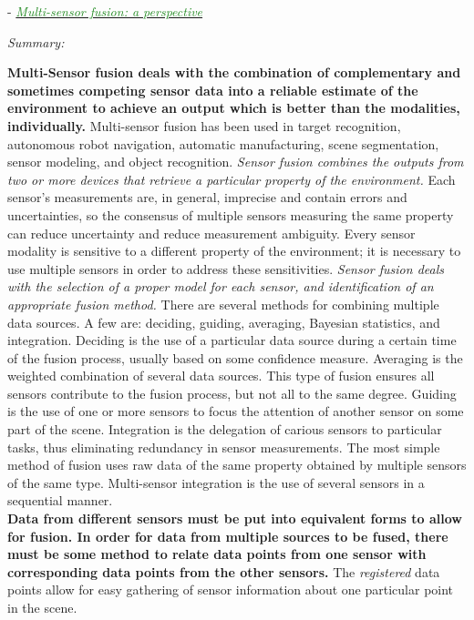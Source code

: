 \documentclass[]{article}
\newcommand{\paperentry}[4]{
            \hangindent=1cm
            \textcolor{red}{\cite{#1}} - \href{run:../References/#3}{\textcolor{ForestGreen}{\textit{#2}}}
            
            \noindent            
            \begin{minipage}[t]{0.1\linewidth}\hfill\end{minipage}
            \begin{minipage}[t]{0.8\linewidth}\textcolor{NavyBlue}{{\textit{Summary:}}}#4\end{minipage}
            \vspace{.25cm}
          }
\begin{document}
			
			\paperentry{hackett1990multisensorfusion}
			{Multi-sensor fusion: a perspective}
			{Fusion/Reviews/hackett1990multisensorfusion.pdf}
			{}\newline
			\textbf{Multi-Sensor fusion deals with the combination of complementary and sometimes competing sensor data into a reliable estimate of the environment to achieve an output which is better than the modalities, individually.}  Multi-sensor fusion has been used  in target recognition, autonomous robot navigation, automatic manufacturing, scene segmentation, sensor modeling, and object recognition.  \textit{Sensor fusion combines the outputs from two or more devices that retrieve a particular property of the environment.}  Each sensor's measurements are, in general, imprecise and contain errors and uncertainties, so the consensus of multiple sensors measuring the same property can reduce uncertainty and reduce measurement ambiguity. Every sensor modality is sensitive to a different property of the environment; it is necessary to use multiple sensors in order to address these sensitivities. \textit{Sensor fusion deals with the selection of a proper model  for each sensor, and identification of an appropriate fusion method.}  There are several methods for combining multiple data sources.  A few are: deciding, guiding, averaging, Bayesian statistics, and integration.  Deciding is the use of a particular data source during a certain time of the fusion process, usually based on some confidence measure.  Averaging is the weighted combination of several data sources. This type of fusion ensures all sensors contribute to the fusion process, but not all to the same degree.  Guiding is the use of one or more sensors to focus the attention of another sensor on some part of the scene.  Integration is the  delegation of carious sensors to particular tasks, thus eliminating redundancy in sensor measurements.  The most simple method of fusion uses raw data of the same property obtained by multiple sensors of the same type.  Multi-sensor integration is the use of several sensors in a sequential manner. \\
			\noindent
			\textbf{Data from different sensors must be put into equivalent forms to allow for fusion.  In order for data from multiple sources to be fused, there must be some method to relate data points from one sensor with corresponding data points from the other sensors.}  The \textit{registered} data points allow for easy gathering of sensor information about one particular point in the scene.  \\
\end{document}
